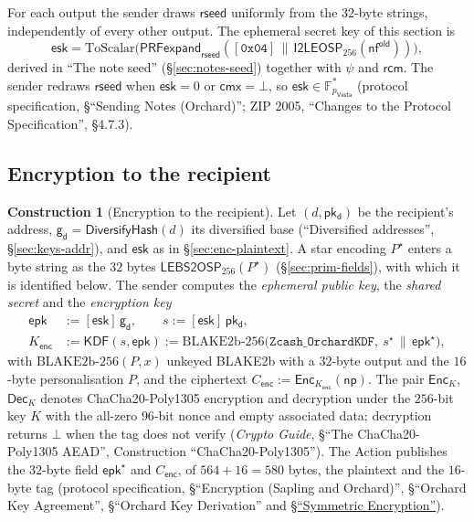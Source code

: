 \documentclass[11pt,a4paper]{article}
\theoremstyle{definition}
\newtheorem{construction}[theorem]{Construction}
\newcommand{\F}{\mathbb{F}}
\newcommand{\nfsym}{\mathsf{nf}}
\newcommand{\cmx}{\mathsf{cmx}}
\newcommand{\Vesta}{\ensuremath{\mathsf{Vesta}}}
\newcommand{\pkd}{\ensuremath{\mathsf{pk_d}}}
\newcommand{\gd}{\ensuremath{\mathsf{g_d}}}
\newcommand{\rcm}{\ensuremath{\mathsf{rcm}}}
\begin{document}
For each output the sender draws $\mathsf{rseed}$ uniformly from the $32$-byte
strings, independently of every other output. The ephemeral secret key of
this section is
\[
  \mathsf{esk} = \mathrm{ToScalar}\bigl(\mathsf{PRFexpand}_{\mathsf{rseed}}
    ([\mathtt{0x04}] \,\|\, \mathsf{I2LEOSP}_{256}(\nfsym^{\mathsf{old}}))
  \bigr),
\]
derived in ``The note seed'' (\S\ref{sec:notes-seed}) together with $\psi$
and $\rcm$. The sender redraws $\mathsf{rseed}$ when $\mathsf{esk} = 0$ or
$\cmx = \bot$, so $\mathsf{esk} \in \F_{p_{\Vesta}}^{*}$ (protocol
specification, \S``Sending Notes (Orchard)''; ZIP 2005, ``Changes to the
Protocol Specification'', \S 4.7.3).

\FloatBarrier
\subsection{Encryption to the recipient}\label{sec:enc-encrypt}

\begin{construction}[Encryption to the recipient]
Let $(d, \pkd)$ be the recipient's address, $\gd = \mathsf{DiversifyHash}(d)$
its diversified base (``Diversified addresses'', \S\ref{sec:keys-addr}), and
$\mathsf{esk}$ as in \S\ref{sec:enc-plaintext}. A star encoding
$P^{\star}$ enters a byte string as the $32$ bytes
$\mathsf{LEBS2OSP}_{256}(P^{\star})$ (\S\ref{sec:prim-fields}), with which it
is identified below. The sender computes the \emph{ephemeral
public key}, the \emph{shared secret} and the \emph{encryption key}
\begin{align*}
  \mathsf{epk} &:= [\mathsf{esk}]\,\gd, \qquad
  s := [\mathsf{esk}]\,\pkd, \\
  K_{\mathsf{enc}} &:= \mathsf{KDF}(s, \mathsf{epk}) :=
    \mathrm{BLAKE2b\text{-}256}\bigl(\texttt{Zcash\_OrchardKDF},\
    s^{\star} \,\|\, \mathsf{epk}^{\star}\bigr),
\end{align*}
with $\mathrm{BLAKE2b\text{-}256}(P, x)$ unkeyed BLAKE2b with a $32$-byte
output and the $16$-byte personalisation $P$, and the ciphertext
$C_{\mathsf{enc}} := \mathsf{Enc}_{K_{\mathsf{enc}}}(\mathsf{np})$. The pair
$\mathsf{Enc}_K$, $\mathsf{Dec}_K$ denotes ChaCha20-Poly1305 encryption and
decryption under the $256$-bit key $K$ with the all-zero $96$-bit nonce and
empty associated data; decryption returns $\bot$ when the tag does not
verify (\emph{Crypto Guide}, \S``The ChaCha20-Poly1305 AEAD'', Construction
``ChaCha20-Poly1305''). The Action publishes the $32$-byte field
$\mathsf{epk}^{\star}$ and $C_{\mathsf{enc}}$, of $564 + 16 = 580$ bytes,
the plaintext and the $16$-byte tag (protocol specification,
\S``Encryption (Sapling and Orchard)'', \S``Orchard Key Agreement'',
\S``Orchard Key Derivation'' and
\href{https://zips.z.cash/protocol/protocol.pdf#concretesym}%
{\S``Symmetric Encryption''}).
\end{construction}
\end{document}
